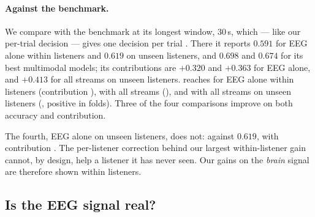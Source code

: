 \paragraph{Against the benchmark.}
We compare with the benchmark at its longest window, $30$\,s, which --- like our
per-trial decision --- gives one decision per trial \citep{maestro2026}. There it
reports $0.591$ for EEG alone within listeners and $0.619$ on unseen listeners,
and $0.698$ and $0.674$ for its best multimodal models; its contributions are
$+0.320$ and $+0.363$ for EEG alone, and $+0.413$ for all streams on unseen
listeners. \merit{} reaches  for EEG alone within listeners
(contribution ),  with all streams
(), and  with all streams on unseen
listeners (, positive in  folds). Three of
the four comparisons improve on both accuracy and contribution.

The fourth, EEG alone on unseen listeners, does not: 
against $0.619$, with contribution . The per-listener
correction behind our largest within-listener gain cannot, by design, help a
listener it has never seen. Our gains on the \emph{brain} signal are therefore
shown within listeners.

\subsection{Is the EEG signal real?}
\label{sec:res-mm}

